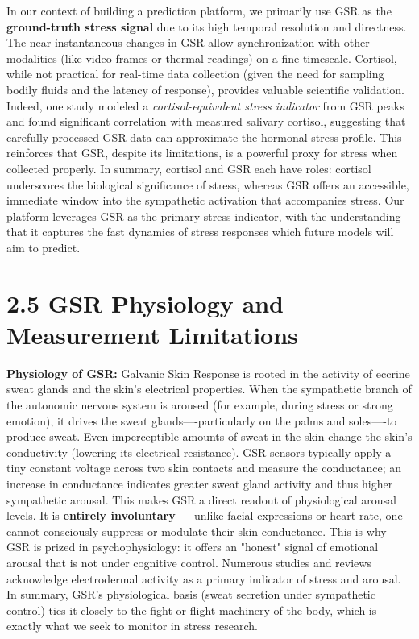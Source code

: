 \documentclass[11pt,a4paper]{report}
\begin{document}
In our context of building a prediction platform, we primarily use GSR
as the \textbf{ground-truth stress signal} due to its high temporal
resolution and directness. The near-instantaneous changes in GSR allow
synchronization with other modalities (like video frames or thermal
readings) on a fine timescale. Cortisol, while not practical for
real-time data collection (given the need for sampling bodily fluids and
the latency of response), provides valuable scientific validation.
Indeed, one study modeled a \textit{cortisol-equivalent stress indicator} from
GSR peaks and found significant correlation with measured salivary
cortisol\cite{CortisolStressIndicator2020},
suggesting that carefully processed GSR data can approximate the
hormonal stress profile. This reinforces that GSR, despite its
limitations, is a powerful proxy for stress when collected properly. In
summary, cortisol and GSR each have roles: cortisol underscores the
biological significance of stress, whereas GSR offers an accessible,
immediate window into the sympathetic activation that accompanies
stress. Our platform leverages GSR as the primary stress indicator, with
the understanding that it captures the fast dynamics of stress responses
which future models will aim to predict.

\section{2.5 GSR Physiology and Measurement Limitations}

\textbf{Physiology of GSR:} Galvanic Skin Response is rooted in the activity
of eccrine sweat glands and the skin's electrical properties. When the
sympathetic branch of the autonomic nervous system is aroused (for
example, during stress or strong emotion), it drives the sweat
glands----particularly on the palms and soles----to produce
sweat.
Even imperceptible amounts of sweat in the skin change the skin's
conductivity (lowering its electrical resistance). GSR sensors typically
apply a tiny constant voltage across two skin contacts and measure the
conductance; an increase in conductance indicates greater sweat gland
activity and thus higher sympathetic
arousal\cite{GSRGuideIMotions}.
This makes GSR a direct readout of physiological arousal levels. It is
\textbf{entirely involuntary} --- unlike facial expressions or heart rate, one
cannot consciously suppress or modulate their skin conductance. This is
why GSR is prized in psychophysiology: it offers an "honest" signal of
emotional arousal that is not under cognitive control. Numerous studies
and reviews acknowledge electrodermal activity as a primary indicator of
stress and
arousal\cite{GSRPPGMachineLearning2024}.
In summary, GSR's physiological basis (sweat secretion under sympathetic
control) ties it closely to the fight-or-flight machinery of the body,
which is exactly what we seek to monitor in stress research.
\end{document}
